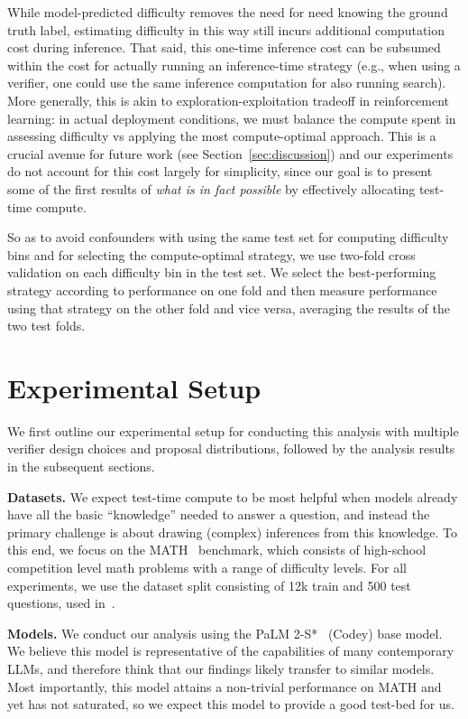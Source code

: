 While model-predicted difficulty removes the need for need knowing the ground truth label, estimating difficulty in this way still incurs additional computation cost during inference. That said, this one-time inference cost can be subsumed within the cost for actually running an inference-time strategy (e.g., when using a verifier, one could use the same inference computation for also running search). More generally, this is akin to exploration-exploitation tradeoff in reinforcement learning: in actual deployment conditions, we must balance the compute spent in assessing difficulty vs applying the most compute-optimal approach. This is a crucial avenue for future work (see Section~\ref{sec:discussion}) and our experiments do not account for this cost largely for simplicity, since our goal is to present some of the first results of \emph{what is in fact possible} by effectively allocating test-time compute.

So as to avoid confounders with using the same test set for computing difficulty bins and for selecting the compute-optimal strategy, we use two-fold cross validation on each difficulty bin in the test set. We select the best-performing strategy according to performance on one fold and then measure performance using that strategy on the other fold and vice versa, averaging the results of the two test folds.

\vspace{-0.2cm}
\section{Experimental Setup}
\label{sec:setup}
\vspace{-0.2cm}
We first outline our experimental setup for conducting this analysis with multiple verifier design choices and proposal distributions, followed by the analysis results in the subsequent sections.

\textbf{Datasets.} We expect test-time compute to be most helpful when models already have all the basic ``knowledge'' needed to answer a question, and instead the primary challenge is about drawing (complex) inferences from this knowledge. To this end, we focus on the MATH~\citep{hendrycks2021measuring} benchmark, which consists of high-school competition level math problems with a range of difficulty levels. For all experiments, we use the dataset split consisting of 12k train and 500 test questions, used in~\citet{lightman2023lets}.

\textbf{Models.} We conduct our analysis using the PaLM 2-S*~\citep{anil2023palm} (Codey) base model. We believe this model is representative of the capabilities of many contemporary LLMs, and therefore think that our findings likely transfer to similar models. Most importantly, this model attains a non-trivial performance on MATH and yet has not saturated, so we expect this model to provide a good test-bed for us.

